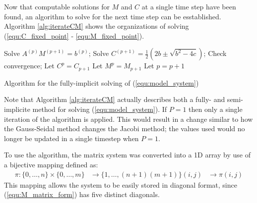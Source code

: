 Now that computable solutions for $M$ and $C$ at a single time step have been found, an algorithm to solve for the next time step can be esstablished.
Algorithm \ref{alg:iterateCM} shows the organizations of solving (\ref{equ:C_fixed_point} - \ref{equ:M_fixed_point}). 
\begin{algorithm}
  \Begin
  {
    {
        Solve $A^{(p)} M^{(p+1)} = b^{(p)}$;
        Solve $C^{(p+1)} = \frac{1}{2} \left( 2b \pm \sqrt{b^2 - 4c} \right)$;
        Check convergence; 
        Let $C^{p} = C_{p+1}$\;
        Let $M^{p} = M_{p+1}$\;
        Let $p = p + 1 $\;
    }
  }
  \caption{Algorithm for the fully-implicit solving of (\ref{equ:model_system}) }
  \label{alg:iterateCM}
\end{algorithm}
Note that Algorithm \ref{alg:iterateCM} actually describes both a fully- and semi- implicite method for solving (\ref{equ:model_system}). 
If $P = 1$ then only a single iteration of the algorithm is applied.
This would result in a change similar to how the Gauss-Seidal method changes the Jacobi method; the values used would no longer be updated in a single timestep when $P = 1$.

To use the algorithm, the matrix system was converted into a 1D array by use of a bijective mapping defined as:
\begin{equation}
\begin{aligned}
  \pi : \{ 0, \ldots, n\} \times \{0, \ldots, m\} &\to \{1, \ldots, (n+1)(m+1) \}
  (i,j) & \to \pi(i,j)
\end{aligned}
\end{equation}
This mapping allows the system to be easily stored in diagonal format, since (\ref{equ:M_matrix_form}) has five distinct diagonals.


